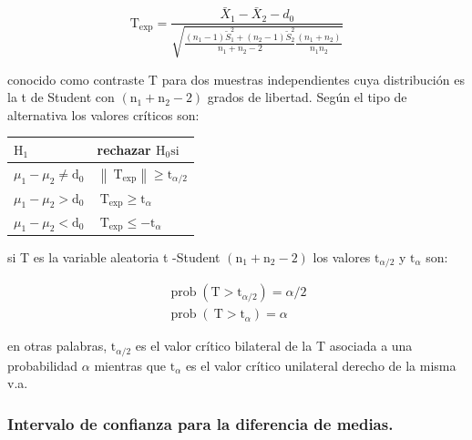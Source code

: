 \documentclass[
]{article}
\begin{document}
\[
\mathrm{T}_{\exp }=\frac{\bar{X}_{1}-\bar{X}_{2}-d_{0}}{\sqrt{\frac{\left(n_{1}-1\right) \widetilde{S}_{1}^{2}+\left(n_{2}-1\right) \widetilde{S}_{2}^{2}}{n_{1}+n_{2}-2} \frac{\left(n_{1}+n_{2}\right)}{n_{1} n_{2}}}}
\]

conocido como contraste T para dos muestras independientes cuya distribución es la t de Student con \(\left(\mathrm{n}_{1}+\mathrm{n}_{2}-2\right)\) grados de libertad. Según el tipo de alternativa los valores críticos son:

\begin{longtable}[]{@{}
  >{\centering\arraybackslash}p{}
  >{\centering\arraybackslash}p{}@{}}
\toprule\noalign{}
\begin{minipage}[b]{\linewidth}\centering
\(\mathrm{H}_{1}\)
\end{minipage} & \begin{minipage}[b]{\linewidth}\centering
rechazar \(\mathrm{H}_{0} \mathrm{si}\)
\end{minipage} \\
\midrule\noalign{}
\endhead
\bottomrule\noalign{}
\endlastfoot
\(\mu_{1}-\mu_{2} \neq \mathrm{d}_{0}\) & \(\left\|\mathrm{~T}_{\exp }\right\| \geq \mathrm{t}_{\alpha / 2}\) \\
\(\mu_{1}-\mu_{2}>\mathrm{d}_{0}\) & \(\mathrm{~T}_{\exp } \geq \mathrm{t}_{\alpha}\) \\
\(\mu_{1}-\mu_{2}<\mathrm{d}_{0}\) & \(\mathrm{~T}_{\exp } \leq-\mathrm{t}_{\alpha}\) \\
\end{longtable}

si T es la variable aleatoria t -Student \(\left(\mathrm{n}_{1}+\mathrm{n}_{2}-2\right)\) los valores \(\mathrm{t}_{\alpha / 2}\) y \(\mathrm{t}_{\alpha}\) son:

\[
\begin{gathered}
\operatorname{prob}\left(\mathrm{T}>\mathrm{t}_{\alpha / 2}\right)=\alpha / 2 \\
\operatorname{prob}\left(\mathrm{~T}>\mathrm{t}_{\alpha}\right)=\alpha
\end{gathered}
\]

en otras palabras, \(\mathrm{t}_{\alpha / 2}\) es el valor crítico bilateral de la T asociada a una probabilidad \(\alpha\) mientras que \(\mathrm{t}_{\alpha}\) es el valor crítico unilateral derecho de la misma v.a.

\subsubsection{Intervalo de confianza para la diferencia de medias.}\label{intervalo-de-confianza-para-la-diferencia-de-medias.}
\end{document}
